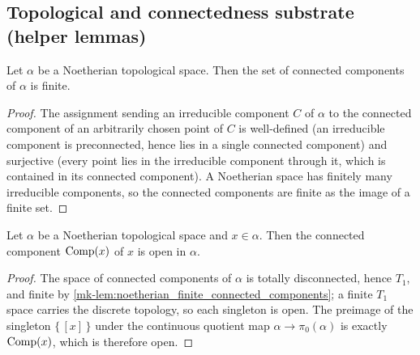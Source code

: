 \subsection{Topological and connectedness substrate (helper lemmas)}
\label{mk-subsec:identity_component_substrate}


\begin{lemma}
  \label{mk-lem:noetherian_finite_connected_components}

  Let \(\alpha\) be a Noetherian topological space. Then the set of
  connected components of \(\alpha\) is finite.
\end{lemma}
\begin{proof}
  The assignment sending an irreducible component \(C\) of \(\alpha\) to the
  connected component of an arbitrarily chosen point of \(C\) is
  well-defined (an irreducible component is preconnected, hence lies in a
  single connected component) and surjective (every point lies in the
  irreducible component through it, which is contained in its connected
  component). A Noetherian space has finitely many irreducible components,
  so the connected components are finite as the image of a finite set.

\end{proof}

\begin{lemma}\label{mk-lem:noetherian_isopen_connected_component}
  \leanok

  Let \(\alpha\) be a Noetherian topological space and \(x \in \alpha\). Then
  the connected component \(\operatorname{Comp}(x)\) of \(x\) is open in \(\alpha\).
\end{lemma}
\begin{proof}
  The space of connected components of \(\alpha\) is totally disconnected,
  hence \(T_1\), and finite by
  \ref{mk-lem:noetherian_finite_connected_components}; a finite \(T_1\) space
  carries the discrete topology, so each singleton is open. The preimage of
  the singleton \(\{\,[x]\,\}\) under the continuous quotient map
  \(\alpha \to \pi_0(\alpha)\) is exactly \(\operatorname{Comp}(x)\), which is
  therefore open.
\end{proof}

